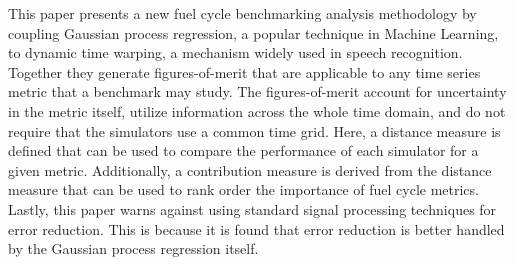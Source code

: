 This paper presents a new fuel cycle benchmarking analysis methodology
by coupling Gaussian process regression, a popular technique in Machine 
Learning, to dynamic time warping, a mechanism widely used in speech 
recognition. Together they generate figures-of-merit that are applicable to
any time series metric that a benchmark may study. The figures-of-merit
account for uncertainty in the metric itself, utilize information
across the whole time domain, and do not require that the simulators
use a common time grid. Here, a distance measure is defined that can be used 
to compare the performance of each simulator for a given metric. Additionally, 
a contribution measure is derived from the distance measure that can be used 
to rank order the importance of fuel cycle metrics. Lastly, this paper 
warns against using standard signal processing techniques for error reduction.
This is because it is found that error reduction is better handled by the 
Gaussian process regression itself.
